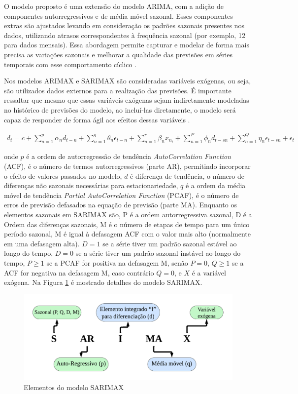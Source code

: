  O modelo proposto é uma extensão do modelo ARIMA, com a adição de componentes autorregressivos e de média móvel sazonal. Esses componentes extras são ajustados levando em consideração os padrões sazonais presentes nos dados, utilizando atrasos correspondentes à frequência sazonal (por exemplo, 12 para dados mensais). Essa abordagem permite capturar e modelar de forma mais precisa as variações sazonais e melhorar a qualidade das previsões em séries temporais com esse comportamento cíclico \cite{sarima}.
 
 Nos modelos ARIMAX e SARIMAX são consideradas variáveis exógenas, ou seja, são utilizados dados externos para a realização das previsões. É importante ressaltar que mesmo que essas variáveis exógenas sejam indiretamente modeladas no histórico de previsões do modelo, ao incluí-las diretamente, o modelo será capaz de responder de forma ágil aos efeitos dessas variáveis \cite{sarima}.
 
 \begin{eqnarray}
 	d_t=c+\sum_{n=1}^p \alpha_n d_{t-n}+\sum_{n=1}^q \theta_n \epsilon_{t-n}+\sum_{n=1}^r \beta_n x_{n_t}+\sum_{n=1}^P \phi_n d_{t-s n}+\sum_{n=1}^Q \eta_n \epsilon_{t-s n}+\epsilon_t \label{eq:sarmax}
 \end{eqnarray}
 
 \noindent onde $p$ é a ordem de autorregressão de tendência \textit{AutoCorrelation Function} (ACF), é o número de termos autorregressivos (parte AR), permitindo incorporar o efeito de valores passados no modelo, $d$ é diferença de tendência, o número de diferenças não sazonais necessárias para estacionariedade, $q$ é a ordem da média móvel de tendência \textit{Partial AutoCorrelation Function} (PCAF), é o número de erros de previsão defasados na equação de previsão (parte MA). Enquanto os elementos sazonais em SARIMAX são, P é a ordem autorregressiva sazonal, D é a Ordem das diferenças sazonais,
 M é o número de etapas de tempo para um único período sazonal, M é igual à defasagem ACF com o valor mais alto (normalmente em uma defasagem alta). $D=1$ se a série tiver um padrão sazonal estável ao longo do tempo, $D=0$ se a série tiver um padrão sazonal instável ao longo do tempo, $P\geq1$ se a PCAF for positiva na defasagem M, senão $P=0$, $Q\geq1$ se a ACF for negativa na defasagem M, caso contrário $Q=0$, e $X$ é a variável exógena. Na Figura \ref{fig:sarimaxmap} é mostrado detalhes do modelo SARIMAX.
 
 
 \begin{figure}[H]
 	\centering
 	\caption{Elementos do modelo SARIMAX}
 	\label{fig:sarimaxmap}
 	\includegraphics[width=\linewidth]{Modelos/Figuras/sarimax_map.pdf}
 	
 \end{figure}
 
